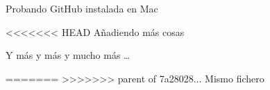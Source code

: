 \documentclass[12pt,a4paper]{article}
\author{JL Gutierrez Villanueva}
\begin{document}
Probando GitHub instalada en Mac

<<<<<<< HEAD
A\~nadiendo m\'as cosas

Y m\'as y m\'as y mucho m\'as \ldots

=======
>>>>>>> parent of 7a28028... Mismo fichero
\end{document}
